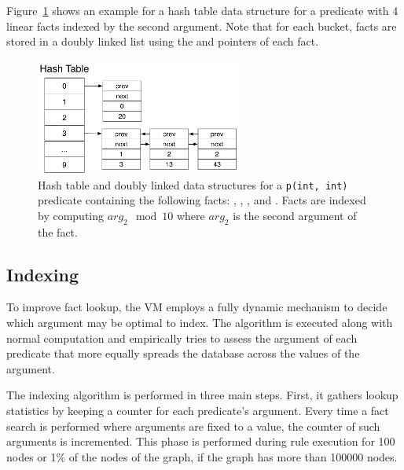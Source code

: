 Figure~\ref{fig:implementation:hash_table} shows an example for a hash table
data structure for a  predicate with 4 linear facts indexed by
the second argument. Note that for each bucket, facts are stored in a doubly
linked list using the  and  pointers of each fact.

\begin{figure}[ht]
   \centering
   \includegraphics[width=0.6\textwidth]{figures/implementation/hash_table.pdf}

   \caption{Hash table and doubly linked data structures for a \texttt{p(int,
   int)} predicate containing the following facts: , , , and . Facts are indexed by computing
   $arg_2\mod{}10$ where $arg_2$ is the second argument of the fact.}

   \label{fig:implementation:hash_table}
\end{figure}


\subsection{Indexing}\label{sec:implementation:indexing}

To improve fact lookup, the VM employs a fully dynamic mechanism to
decide which argument may be optimal to index.  The algorithm is
executed along with normal computation and empirically tries to
assess the argument of each predicate that more equally spreads the
database across the values of the argument. 

The indexing algorithm is performed in three main steps. First, it gathers
lookup statistics by keeping a counter for each predicate's argument. Every time
a fact search is performed where arguments are fixed to a value, the counter of
such arguments is incremented. This phase is performed during rule execution for
100 nodes or 1\% of the nodes of the graph, if the graph has more than 100000
nodes.

